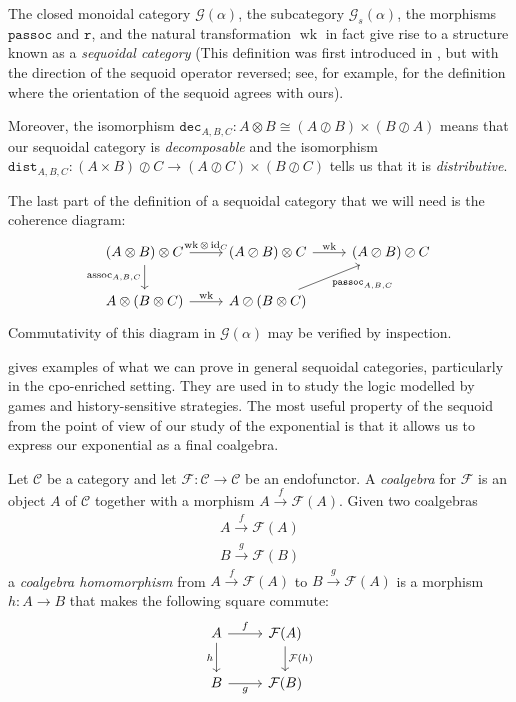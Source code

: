 \documentclass[11pt]{article} %
\theoremstyle{plain} %
\theoremstyle{definition} %
\theoremstyle{note}
\theoremstyle{exercisestyle}
\newcommand{\map}[3]{#2\xrightarrow{#1} #3}
\newcommand*\from{\colon}
\newcommand{\cmap}[3]{#1\from{}#2\to{}#3}
\DeclareMathOperator{\id}{id}
\newcommand{\tensor}{\otimes}
\newcommand{\sequoid}{\oslash}
\newcommand{\G}{\mathcal G}
\newcommand{\F}{\mathcal F}
\DeclareMathOperator{\assoc}{assoc}
\newcommand{\C}{{\mathcal{C}}}
\DeclareMathOperator{\wk}{wk}
\newcommand{\passoc}{{\texttt{passoc}}}
\newcommand{\run}{{\texttt{r}}}
\newcommand{\dist}{{\texttt{dist}}}
\newcommand{\dec}{{\texttt{dec}}}
\begin{document}
The closed monoidal category $\G(\alpha)$, the subcategory $\G_s(\alpha)$, the morphisms $\passoc$ and $\run$, and the natural transformation $\wk$ in fact give rise to a structure known as a \emph{sequoidal category} (This definition was first introduced in \cite{laird02}, but with the direction of the sequoid operator reversed; see, for example, \cite{martinsthesis} for the definition where the orientation of the sequoid agrees with ours).  

Moreover, the isomorphism $\dec_{A,B,C}\from A\tensor B\cong (A\sequoid B)\times(B\sequoid A)$ means that our sequoidal category is \emph{decomposable} and the isomorphism $\dist_{A,B,C}\from (A\times B)\sequoid C\to (A\sequoid C)\times(B\sequoid C)$ tells us that it is \emph{distributive}.  

The last part of the definition of a sequoidal category that we will need is the coherence diagram:
\[
  \begin{tikzcd}
    (A \tensor B) \tensor C \arrow[r, "\wk\tensor\id_C"] \arrow[d, "\assoc_{A,B,C}"']
      & (A \sequoid B) \tensor C \arrow[r, "\wk"]
        & (A \sequoid B) \sequoid C \\
    A \tensor (B \tensor C) \arrow[r, "\wk"]
      & A \sequoid (B \tensor C) \arrow[ur, "\passoc_{A,B,C}"']
        &
  \end{tikzcd}
  \]
Commutativity of this diagram in $\G(\alpha)$ may be verified by inspection.  

\cite{laird02} gives examples of what we can prove in general sequoidal categories, particularly in the cpo-enriched setting.  They are used in \cite{martinsthesis} to study the logic modelled by games and history-sensitive strategies.  The most useful property of the sequoid from the point of view of our study of the exponential is that it allows us to express our exponential as a final coalgebra.

Let $\C$ be a category and let $\F\from \C\to\C$ be an endofunctor.  A \emph{coalgebra} for $\F$ is an object $A$ of $\C$ together with a morphism $\map{f}{A}{\F(A)}$.  Given two coalgebras
\begin{gather*}
  \map{f}{A}{\F(A)}\\
  \map{g}{B}{\F(B)}
\end{gather*}
a \emph{coalgebra homomorphism} from $\map{f}{A}{\F(A)}$ to $\map{g}{B}{\F(A)}$ is a morphism $\cmap{h}{A}{B}$ that makes the following square commute:
\[
  \begin{tikzcd}
    A \arrow[r, "f"] \arrow[d, "h"']
      & \F(A) \arrow[d, "\F(h)"] \\
    B \arrow[r, "g"']
      & \F(B)
  \end{tikzcd}
  \]
\end{document}
